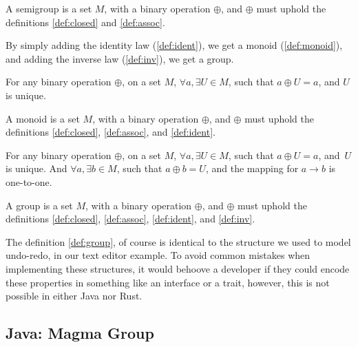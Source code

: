 \begin{definition}[Semigroup] \label{def:semi}
  A semigroup is a set $M$, with a binary operation $\oplus$, and $\oplus$ must
  uphold the definitions \ref{def:closed} and \ref{def:assoc}.
\end{definition}

By simply adding the identity law (\ref{def:ident}), we get a
monoid (\ref{def:monoid}), and adding the inverse law
(\ref{def:inv}), we get a group.

\begin{definition} \label{def:ident}
  For any binary operation $\oplus$, on a set $M$,
  $\forall a, \exists U \in M$, such that
  $a \oplus U = a$, and $U$ is unique.
\end{definition}

\begin{definition}[Monoid] \label{def:monoid}
  A monoid is a set $M$, with a binary operation $\oplus$, and $\oplus$ must
  uphold the definitions \ref{def:closed}, \ref{def:assoc}, and \ref{def:ident}.
\end{definition}

\begin{definition} \label{def:inv}
  For any binary operation $\oplus$, on a set $M$,
  $\forall a, \exists U \in M$, such that
  $a \oplus U = a$, and $U$ is unique.
  And $\forall a, \exists b \in M$, such that $a \oplus b = U$, and the mapping
  for $a \to b$ is one-to-one.
\end{definition}

\begin{definition}[Group] \label{def:group}
  A group is a set $M$, with a binary operation $\oplus$, and $\oplus$ must
  uphold the definitions \ref{def:closed}, \ref{def:assoc}, \ref{def:ident},
  and \ref{def:inv}.
\end{definition}

The definition \ref{def:group}, of course is identical to the structure we used
to model undo-redo, in our text editor example. To avoid common mistakes when
implementing these structures, it would behoove a developer if they could encode
these properties in something like an interface or a trait, however, this is not
possible in either Java nor Rust.



\subsection{Java: Magma \to Group}

